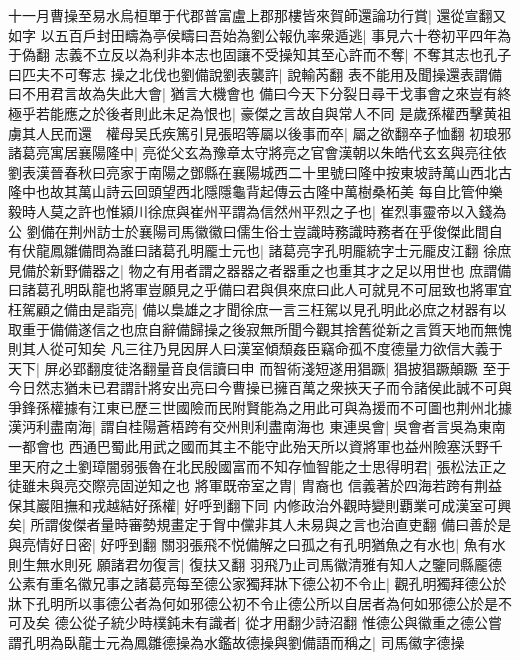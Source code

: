 十一月曹操至易水烏桓單于代郡普富盧上郡那樓皆來賀師還論功行賞|{
	還從宣翻又如字}
以五百戶封田疇為亭侯疇曰吾始為劉公報仇率衆遁逃|{
	事見六十卷初平四年為于偽翻}
志義不立反以為利非本志也固讓不受操知其至心許而不奪|{
	不奪其志也孔子曰匹夫不可奪志}
操之北伐也劉備說劉表襲許|{
	說輸芮翻}
表不能用及聞操還表謂備曰不用君言故為失此大會|{
	猶言大機會也}
備曰今天下分裂日尋干戈事會之來豈有終極乎若能應之於後者則此未足為恨也|{
	豪傑之言故自與常人不同}
是歲孫權西擊黄祖虜其人民而還　權母吴氏疾篤引見張昭等屬以後事而卒|{
	屬之欲翻卒子恤翻}
初琅邪諸葛亮寓居襄陽隆中|{
	亮從父玄為豫章太守將亮之官會漢朝以朱皓代玄玄與亮往依劉表漢晉春秋曰亮家于南陽之鄧縣在襄陽城西二十里號曰隆中按東坡詩萬山西北古隆中也故其萬山詩云回頭望西北隱隱龜背起傳云古隆中萬樹桑柘美}
每自比管仲樂毅時人莫之許也惟潁川徐庶與崔州平謂為信然州平烈之子也|{
	崔烈事靈帝以入錢為公}
劉備在荆州訪士於襄陽司馬徽徽曰儒生俗士豈識時務識時務者在乎俊傑此間自有伏龍鳳雛備問為誰曰諸葛孔明龎士元也|{
	諸葛亮字孔明龎統字士元龎皮江翻}
徐庶見備於新野備器之|{
	物之有用者謂之器器之者器重之也重其才之足以用世也}
庶謂備曰諸葛孔明臥龍也將軍豈願見之乎備曰君與俱來庶曰此人可就見不可屈致也將軍宜枉駕顧之備由是詣亮|{
	備以梟雄之才聞徐庶一言三枉駕以見孔明此必庶之材器有以取重于備備遂信之也庶自辭備歸操之後寂無所聞今觀其捨舊從新之言質天地而無愧則其人從可知矣}
凡三往乃見因屏人曰漢室傾頹姦臣竊命孤不度德量力欲信大義于天下|{
	屏必郢翻度徒洛翻量音良信讀曰申}
而智術淺短遂用猖蹶|{
	猖披猖蹶顛蹶}
至于今日然志猶未已君謂計將安出亮曰今曹操已擁百萬之衆挾天子而令諸侯此誠不可與爭鋒孫權據有江東已歷三世國險而民附賢能為之用此可與為援而不可圖也荆州北據漢沔利盡南海|{
	謂自桂陽蒼梧跨有交州則利盡南海也}
東連吳會|{
	吳會者言吳為東南一都會也}
西通巴蜀此用武之國而其主不能守此殆天所以資將軍也益州險塞沃野千里天府之土劉璋闇弱張魯在北民殷國富而不知存恤智能之士思得明君|{
	張松法正之徒雖未與亮交際亮固逆知之也}
將軍既帝室之胄|{
	胄裔也}
信義著於四海若跨有荆益保其巖阻撫和戎越結好孫權|{
	好呼到翻下同}
内修政治外觀時變則覇業可成漢室可興矣|{
	所謂俊傑者量時審勢規畫定于胷中儻非其人未易與之言也治直吏翻}
備曰善於是與亮情好日密|{
	好呼到翻}
關羽張飛不悦備解之曰孤之有孔明猶魚之有水也|{
	魚有水則生無水則死}
願諸君勿復言|{
	復扶又翻}
羽飛乃止司馬徽清雅有知人之鑒同縣龎德公素有重名徽兄事之諸葛亮每至德公家獨拜牀下德公初不令止|{
	觀孔明獨拜德公於牀下孔明所以事德公者為何如邪德公初不令止德公所以自居者為何如邪德公於是不可及矣}
德公從子統少時樸鈍未有識者|{
	從才用翻少詩沼翻}
惟德公與徽重之德公嘗謂孔明為臥龍士元為鳳雛德操為水鑑故德操與劉備語而稱之|{
	司馬徽字德操}



